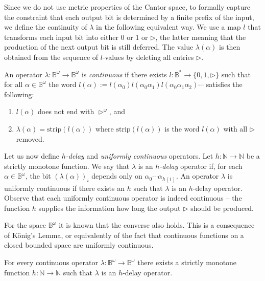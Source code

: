 \documentclass[fleqn,envcountsame]{LMCS}
\newcommand{\Nat}{\ensuremath{\mathbb{N}}\xspace}
\newcommand{\Bst}{\ensuremath{\mathbb{B}^*}\xspace}
\newcommand{\Bom}{\ensuremath{\mathbb{B}^{\omega}}\xspace}
\newcommand{\al}{\ensuremath{\alpha}\xspace}
\begin{document}
\noindent Since we do not use metric properties of the Cantor space,
to formally capture the constraint that each output bit is
determined by a finite prefix of the input, we define
the continuity of $\lambda$ in the following equivalent way.
We use a map $l$ that transforms each input bit into either $0$ or $1$
or $\rhd$, the latter meaning that the production of the next output bit
is still deferred. The value $\lambda(\al)$ is then obtained from the sequence
of $l$-values by deleting all entries $\rhd$.

\begin{defi}\label{def:continuous_to_delay}
An operator $\lambda:\Bom\to\Bom$ is \emph{continuous}
if there exists $l:\Bst\to\{0,1,\rhd\}$
such that for all $\al\in\Bom$ the word
$l(\al):=l(\al_0)l(\al_0\al_1)l(\al_0\al_1\al_2)\cdots$
satisfies the following:
\begin{enumerate}[(1)]
\item $l(\al)$ does not end with $\rhd^\omega$, and
\item $\lambda(\al) = \text{strip}(l(\al))$ where $\text{strip}(l(\al))$ is
the word $l(\al)$ with all $\rhd$ removed.
\end{enumerate}
\end{defi}

Let us now define \emph{$h$-delay} and \emph{uniformly continuous}
operators. Let $h : \Nat\to\Nat$ be a strictly monotone function.
We say that $\lambda$ is an \emph{$h$-delay} operator if,
for each $\al\in\Bom$, the bit $(\lambda(\al))_i$ depends only
on $\al_0\cdots\al_{h(i)}$. An operator $\lambda$ is uniformly continuous
if there exists an $h$ such that $\lambda$ is an $h$-delay operator.
Observe that each uniformly continuous operator is indeed continuous --
the function $h$ supplies the information 
how long the output $\rhd$ should be produced. 


For the space \Bom it is known that
the converse also holds. This is a consequence of K\"onig's Lemma, or
equivalently of the fact that continuous functions
on a closed bounded space are uniformly continuous.

\begin{lem}\label{lem:continuous_to_delay_operator}
For every continuous operator $\lambda:\Bom\to\Bom$ there exists
a strictly monotone function $h:\Nat\to\Nat$ such that $\lambda$ is
an $h$-delay operator.
\end{lem}
\end{document}
